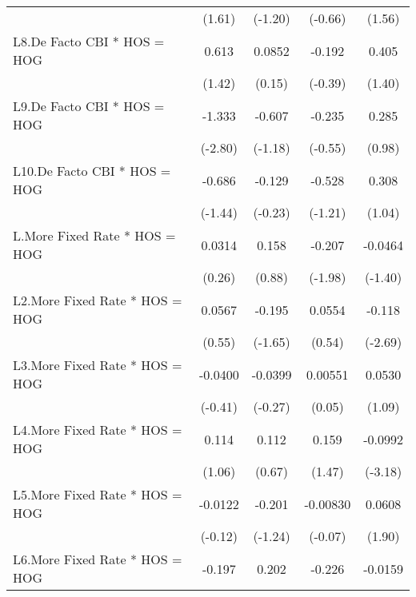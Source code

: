 {\begin{tabular}{l*{4}{c}}
                &   (1.61)         &  (-1.20)         &  (-0.66)         &   (1.56)         \\
[1em]
L8.De Facto CBI * HOS = HOG&    0.613         &   0.0852         &   -0.192         &    0.405         \\
                &   (1.42)         &   (0.15)         &  (-0.39)         &   (1.40)         \\
[1em]
L9.De Facto CBI * HOS = HOG&   -1.333\sym{**} &   -0.607         &   -0.235         &    0.285         \\
                &  (-2.80)         &  (-1.18)         &  (-0.55)         &   (0.98)         \\
[1em]
L10.De Facto CBI * HOS = HOG&   -0.686         &   -0.129         &   -0.528         &    0.308         \\
                &  (-1.44)         &  (-0.23)         &  (-1.21)         &   (1.04)         \\
[1em]
L.More Fixed Rate * HOS = HOG&   0.0314         &    0.158         &   -0.207\sym{*}  &  -0.0464         \\
                &   (0.26)         &   (0.88)         &  (-1.98)         &  (-1.40)         \\
[1em]
L2.More Fixed Rate * HOS = HOG&   0.0567         &   -0.195         &   0.0554         &   -0.118\sym{**} \\
                &   (0.55)         &  (-1.65)         &   (0.54)         &  (-2.69)         \\
[1em]
L3.More Fixed Rate * HOS = HOG&  -0.0400         &  -0.0399         &  0.00551         &   0.0530         \\
                &  (-0.41)         &  (-0.27)         &   (0.05)         &   (1.09)         \\
[1em]
L4.More Fixed Rate * HOS = HOG&    0.114         &    0.112         &    0.159         &  -0.0992\sym{**} \\
                &   (1.06)         &   (0.67)         &   (1.47)         &  (-3.18)         \\
[1em]
L5.More Fixed Rate * HOS = HOG&  -0.0122         &   -0.201         & -0.00830         &   0.0608         \\
                &  (-0.12)         &  (-1.24)         &  (-0.07)         &   (1.90)         \\
[1em]
L6.More Fixed Rate * HOS = HOG&   -0.197         &    0.202         &   -0.226\sym{*}  &  -0.0159         \\

\end{tabular}}
